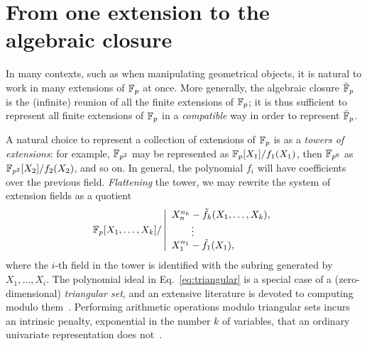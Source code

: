 \documentclass{report}
\theoremstyle{plain}
\theoremstyle{definition}
\begin{document}

\section{From one extension to the algebraic closure}

In many contexts, such as when manipulating geometrical objects, it is
natural to work in many extensions of $\mathbb{F}_p$ at once. %
More generally, the algebraic closure $\bar{\mathbb{F}}_p$ is the (infinite)
reunion of all the finite extensions of $\mathbb{F}_p$; it is thus sufficient
to represent all finite extensions of $\mathbb{F}_p$ in a \emph{compatible}
way in order to represent $\bar{\mathbb{F}}_p$.

A natural choice to represent a collection of extensions of $\mathbb{F}_p$ is
as a \emph{towers of extensions}: for example, $\mathbb{F}_{p^2}$ may be
represented as $\mathbb{F}_{p}[X_1]/f_1(X_1)$, then $\mathbb{F}_{p^6}$ as
$\mathbb{F}_{p^2}[X_2]/f_2(X_2)$, and so on. %
In general, the polynomial $f_i$ will have coefficients over the
previous field. %
\emph{Flattening} the tower, we may rewrite the system of extension
fields as a quotient
\begin{equation}
  \label{eq:triangular}
  \mathbb{F}_p[X_1,\dots,X_k] /
  \left|\begin{array}{l}
          X_n^{n_k} - \tilde{f}_k(X_1,\dots,X_k),\\
          \qquad\vdots\\
          X_1^{n_1} - \tilde{f}_1(X_1),
        \end{array}\right.
\end{equation}
where the $i$-th field in the tower is identified with the subring
generated by $X_1,\dots,X_i$. %
The polynomial ideal in Eq.~\eqref{eq:triangular} is a special case of
a (zero-dimensional) \emph{triangular set}, and an extensive
literature is devoted to computing modulo them~\cite{todo}. %
Performing arithmetic operations modulo triangular sets incurs an
intrinsic penalty, exponential in the number $k$ of variables, that an
ordinary univariate representation does
not~\cite{li+moreno+schost07}. %
\end{document}

